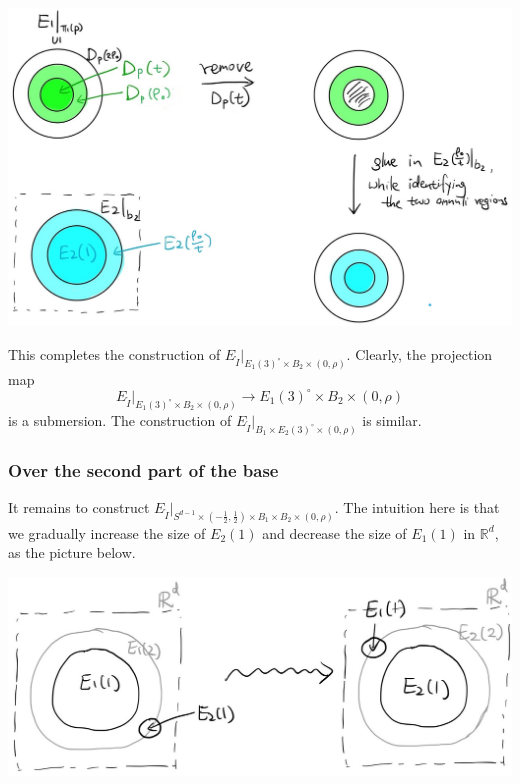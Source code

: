 \documentclass[11pt]{article}
\theoremstyle{definition}
\theoremstyle{remark}
\def\R{\mathbb{R}}
\def\rI{{\mathring{I}}}
\begin{document}
\includegraphics[scale=0.2]{fig3-2_fig}

This completes the construction of $E_\rI|_{E_1(3)^\circ\times B_2\times (0,\rho)}$. Clearly, the projection map
$$E_\rI|_{E_1(3)^\circ\times B_2\times (0,\rho)}\to E_1(3)^\circ\times B_2\times (0,\rho)$$ 
is a submersion. The construction of $E_\rI|_{B_1\times E_2(3)^\circ\times (0,\rho)}$ is similar. 


\subsubsection{Over the second part of the base}
\label{second_subsubsec}
It remains to construct 
$E_\rI|_{S^{d-1}\times(-\frac{1}{2},\frac{1}{2})\times B_1\times B_2\times(0,\rho)}$.
The intuition here is that we gradually increase the size of $E_2(1)$ and decrease the size of $E_1(1)$ in $\R^d$, as the picture below. 

\includegraphics[scale=0.2]{fig4_fig}
\end{document}
